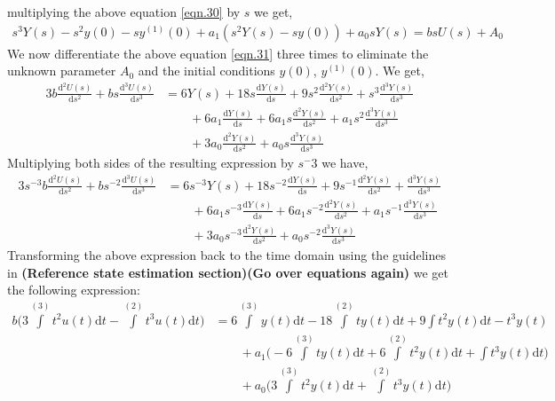 \documentclass{article}
\begin{document}
multiplying the above equation \eqref{eqn.30} by $s$ we get,
\begin{equation}\label{eqn.31}
\begin{split}
s^3Y(s) - s^2y(0) - sy^{(1)}(0) + a_{1}(s^2Y(s)-sy(0)) + a_{0}sY(s) = bsU(s) + A_{0}
\end{split}
\end{equation}
We now differentiate the above equation \eqref{eqn.31} three times to eliminate the unknown parameter $A_{0}$ and the initial conditions $y(0)$, $y^{(1)}(0)$. We get,
\begin{equation}\label{eqn.32}
\begin{split}
3b\frac{\mathrm{d}^2U(s)}{\mathrm{d}s^2} + bs\frac{\mathrm{d}^3U(s)}{\mathrm{d}s^3} & = 6Y(s) + 18s\frac{\mathrm{d}Y(s)}{\mathrm{d}s} + 9s^2\frac{\mathrm{d}^2Y(s)}{\mathrm{d}s^2} + s^3\frac{\mathrm{d}^3Y(s)}{\mathrm{d}s^3} \, \\
&\qquad{}+ 6a_{1}\frac{\mathrm{d}Y(s)}{\mathrm{d}s} + 6a_{1}s\frac{\mathrm{d}^2Y(s)}{\mathrm{d}s^2} + a_{1}s^2\frac{\mathrm{d}^3Y(s)}{\mathrm{d}s^3}\, \\ 
&\qquad{}+ 3a_{0}\frac{\mathrm{d}^2Y(s)}{\mathrm{d}s^2} + a_{0}s\frac{\mathrm{d}^3Y(s)}{\mathrm{d}s^3}
\end{split}
\end{equation}
Multiplying both sides of the resulting expression by $s^-3$ we have,
\begin{equation}\label{eqn.33}
\begin{split}
3s^{-3}b\frac{\mathrm{d}^2U(s)}{\mathrm{d}s^2} + bs^{-2}\frac{\mathrm{d}^3U(s)}{\mathrm{d}s^3} & = 6s^{-3}Y(s) + 18s^{-2}\frac{\mathrm{d}Y(s)}{\mathrm{d}s} + 9s^{-1}\frac{\mathrm{d}^2Y(s)}{\mathrm{d}s^2} + \frac{\mathrm{d}^3Y(s)}{\mathrm{d}s^3} \, \\
&\qquad{}+ 6a_{1}s^{-3}\frac{\mathrm{d}Y(s)}{\mathrm{d}s} + 6a_{1}s^{-2}\frac{\mathrm{d}^2Y(s)}{\mathrm{d}s^2} + a_{1}s^{-1}\frac{\mathrm{d}^3Y(s)}{\mathrm{d}s^3} \, \\ &\qquad{}+ 3a_{0}s^{-3}\frac{\mathrm{d}^2Y(s)}{\mathrm{d}s^2} + a_{0}s^{-2}\frac{\mathrm{d}^3Y(s)}{\mathrm{d}s^3}
\end{split}
\end{equation}
Transforming the above expression back to the time domain using the guidelines in \textbf{(Reference state estimation section)(Go over equations again)} we get the following expression:
\begin{equation}\label{eqn.34}
\begin{split}
b\big(3 \int\limits^{(3)} t^2 u(t) \mathrm{d}t - \int\limits^{(2)} t^3 u(t) \mathrm{d}t\big) & = 6\int\limits^{(3)}y(t) \mathrm{d}t - 18\int\limits^{(2)}ty(t)\mathrm{d}t + 9\int t^2y(t)\mathrm{d}t - t^3y(t)  \, \\
&\qquad{}+ a_{1}\big(-6\int\limits^{(3)} ty(t)\mathrm{d}t + 6\int\limits^{(2)}t^2y(t) \mathrm{d}t + \int t^3y(t)\mathrm{d}t\big) \, \\ 
&\qquad{}+ a_{0}\big(3\int\limits^{(3)}t^2y(t)\mathrm{d}t + \int\limits^{(2)}t^3y(t)\mathrm{d}t\big)
\end{split}
\end{equation}
\end{document}

